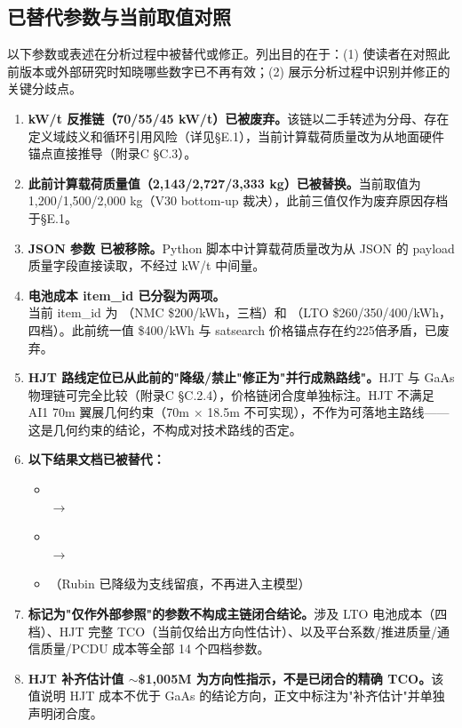\subsection{已替代参数与当前取值对照}
\label{sec:superseded-params}

以下参数或表述在分析过程中被替代或修正。列出目的在于：(1) 使读者在对照此前版本或外部研究时知晓哪些数字已不再有效；(2) 展示分析过程中识别并修正的关键分歧点。

\begin{enumerate}
  \item \textbf{kW/t 反推链（70/55/45 kW/t）已被废弃。}该链以二手转述为分母、存在定义域歧义和循环引用风险（详见§E.1），当前计算载荷质量改为从地面硬件锚点直接推导（附录C §C.3）。

  \item \textbf{此前计算载荷质量值（2,143/2,727/3,333 kg）已被替换。}当前取值为 1,200/1,500/2,000 kg（V30 bottom-up 裁决），此前三值仅作为废弃原因存档于§E.1。

  \item \textbf{JSON 参数  已被移除。}Python 脚本中计算载荷质量改为从 JSON 的 payload 质量字段直接读取，不经过 kW/t 中间量。

  \item \textbf{电池成本 item\_id  已分裂为两项。}\\
        当前 item\_id 为 （NMC \$200/kWh，三档）和 （LTO \$260/350/400/kWh，四档）。此前统一值 \$400/kWh 与 satsearch 价格锚点存在约225倍矛盾，已废弃。

  \item \textbf{HJT 路线定位已从此前的"降级/禁止"修正为"并行成熟路线"。}HJT 与 GaAs 物理链可完全比较（附录C §C.2.4），价格链闭合度单独标注。HJT 不满足 AI1 70m 翼展几何约束（70m $\times$ 18.5m 不可实现），不作为可落地主路线——这是几何约束的结论，不构成对技术路线的否定。

  \item \textbf{以下结果文档已被替代：}
  \begin{itemize}
    \item {}\\
      $\to$ 
    \item {}\\
      $\to$ 
    \item {}（Rubin 已降级为支线留痕，不再进入主模型）
  \end{itemize}

  \item \textbf{标记为"仅作外部参照"的参数不构成主链闭合结论。}涉及 LTO 电池成本（四档）、HJT 完整 TCO（当前仅给出方向性估计）、以及平台系数/推进质量/通信质量/PCDU 成本等全部 14 个四档参数。

  \item \textbf{HJT 补齐估计值 $\sim$\$1,005M 为方向性指示，不是已闭合的精确 TCO。}该值说明 HJT 成本不优于 GaAs 的结论方向，正文中标注为"补齐估计"并单独声明闭合度。
\end{enumerate}

